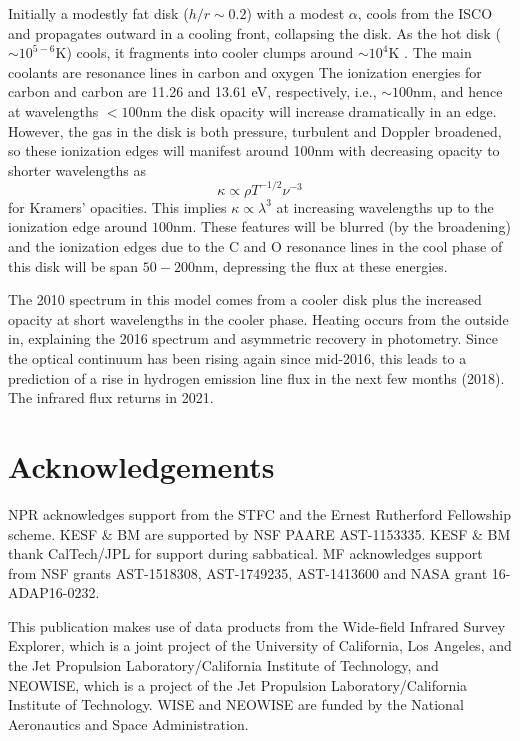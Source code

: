 \documentclass[11pt,a4paper]{article}
\begin{document}
Initially a modestly fat disk ($h/r \sim 0.2$) with a modest $\alpha$,
cools from the ISCO and propagates outward in a cooling front,
collapsing the disk. As the hot disk ($\sim 10^{5-6}$K) cools, it
fragments into cooler clumps around $\sim 10^{4}$K \citep[see e.g.,
][]{McCourt2016}.  The main coolants are resonance lines in carbon and
oxygen \citep[see e.g., Fig. 18 in ][]{Sutherland_Dopita1993} The
ionization energies for carbon and carbon are 11.26 and 13.61 eV,
respectively, i.e., $\sim 100$nm, and hence at wavelengths $<100$nm
the disk opacity will increase dramatically in an edge. %
However, the
gas in the disk is both pressure, turbulent and Doppler broadened, so
these ionization edges will manifest around 100nm with decreasing
opacity to shorter wavelengths as
\begin{equation}
  \kappa \propto \rho T^{-1/2} \nu^{-3}
\end{equation}
for Kramers' opacities. This implies $\kappa \propto \lambda^{3}$
at increasing wavelengths up to the ionization edge around $100$nm.
These features will be blurred (by the broadening) and the ionization
edges due to the C and O resonance lines in the cool phase of this
disk will be span $50-200$nm, depressing the flux at these energies.

The 2010 spectrum in this model comes from a cooler disk plus the
increased opacity at short wavelengths in the cooler phase. Heating
occurs from the outside in, explaining the 2016 spectrum and
asymmetric recovery in photometry.  Since the
optical continuum has been rising again since mid-2016, this leads to
a prediction of a rise in hydrogen emission line flux in the next few
months (2018). The infrared flux returns in 2021. 



\medskip
\medskip
\medskip
\section*{Acknowledgements}
NPR acknowledges support from the STFC and the Ernest Rutherford
Fellowship scheme.  KESF \& BM are supported by NSF PAARE
AST-1153335. KESF \& BM thank CalTech/JPL for support during
sabbatical.  MF acknowledges support from NSF grants AST-1518308,
AST-1749235, AST-1413600 and NASA grant 16-ADAP16-0232.

This publication makes use of data products from the Wide-field
Infrared Survey Explorer, which is a joint project of the University
of California, Los Angeles, and the Jet Propulsion
Laboratory/California Institute of Technology, and NEOWISE, which is a
project of the Jet Propulsion Laboratory/California Institute of
Technology. WISE and NEOWISE are funded by the National Aeronautics
and Space Administration.
\end{document}
